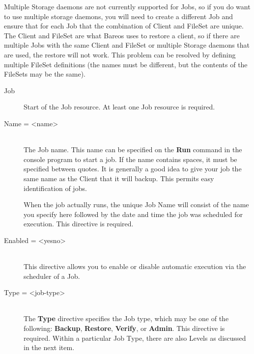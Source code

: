 Multiple Storage daemons are not currently supported for Jobs, so if
you do want to use multiple storage daemons, you will need to create
a different Job and ensure that for each Job that the combination of
Client and FileSet are unique.  The Client and FileSet are what Bareos
uses to restore a client, so if there are multiple Jobs with the same
Client and FileSet or multiple Storage daemons that are used, the
restore will not work.  This problem can be resolved by defining multiple
FileSet definitions (the names must be different, but the contents of
the FileSets may be the same).


\begin{description}

\item [Job]
Start of the Job resource. At least one Job  resource is required.

\item [Name = {\textless}name{\textgreater}] \hfill \\
The Job name. This name can be specified  on the {\bf Run} command in the
console program to start a job. If the  name contains spaces, it must be
specified between quotes. It is  generally a good idea to give your job the
same name as the Client  that it will backup. This permits easy
identification of jobs.

When the job actually runs, the unique Job Name will consist  of the name you
specify here followed by the date and time the  job was scheduled for
execution. This directive is required.

\item [Enabled = {\textless}yes{\textbar}no{\textgreater}] \hfill \\
  This directive allows you to enable or disable automatic execution
  via the scheduler of a Job.

\item [Type = {\textless}job-type{\textgreater}] \hfill \\
The {\bf Type} directive specifies  the Job type, which may be one of the
following: {\bf Backup},  {\bf Restore}, {\bf Verify}, or {\bf Admin}. This
directive  is required. Within a particular Job Type, there are also Levels
as discussed in the next item.

\begin{description}


\end{description}
\end{description}
